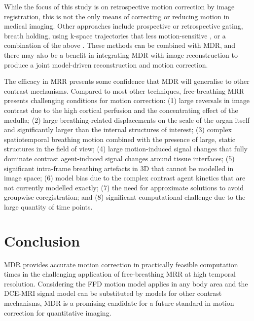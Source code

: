 \documentclass[num-refs]{wiley-article}
\begin{document}
While the focus of this study is on retrospective motion correction by image registration, this is not the only means of correcting or reducing motion in medical imaging. Other approaches include prospective or retrospective gating, breath holding, using k-space trajectories that less motion-sensitive \cite{Ippoliti2019}, or a combination of the above \cite{CollFont2020}. These methods can be combined with MDR, and there may also be a benefit in integrating MDR with image reconstruction to produce a joint model-driven reconstruction \cite{Dikaios2014, Guo2017} and motion correction.

The efficacy in MRR presents some confidence that MDR will generalise to other contrast mechanisms. Compared to most other techniques, free-breathing MRR presents challenging conditions for motion correction: (1) large reversals in image contrast due to the high cortical perfusion and the concentrating effect of the medulla; (2) large breathing-related displacements on the scale of the organ itself and significantly larger than the internal structures of interest; (3) complex spatiotemporal breathing motion combined with the presence of large, static structures in the field of view; (4) large motion-induced signal changes that fully dominate contrast agent-induced signal changes around tissue interfaces; (5) significant intra-frame breathing artefacts in 3D that cannot be modelled in image space; (6) model bias due to the complex contrast agent kinetics that are not currently modelled exactly; (7) the need for approximate solutions to avoid groupwise coregistration; and (8) significant computational challenge due to the large quantity of time points.  

\section{Conclusion}
MDR provides accurate motion correction in practically feasible computation times in the challenging application of free-breathing MRR at high temporal resolution. Considering the FFD motion model applies in any body area and the DCE-MRI signal model can be substituted by models for other contrast mechanisms, MDR is a promising candidate for a future standard in motion correction for quantitative imaging.
\end{document}
